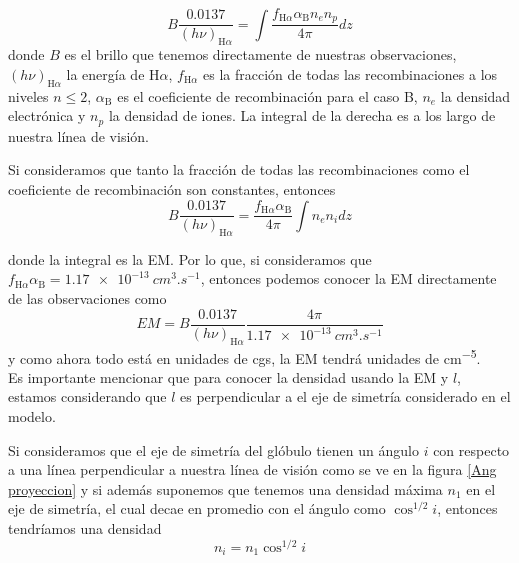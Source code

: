 \documentclass{book}
\begin{document}
\begin{equation}
    B\frac{0.0137}{(h\nu)_{\mathrm{H}\alpha}}=\int \frac{f_{\mathrm{H}\alpha}\alpha_\mathrm{B} n_e n_p}{4\pi} dz
\end{equation}
donde $B$ es el brillo que tenemos directamente de nuestras observaciones, $(h\nu)_{\mathrm{H}\alpha}$ la energía de H$\alpha$, $f_{\mathrm{H}\alpha}$ es la fracción de todas las recombinaciones a los niveles $n\le 2$, $\alpha_\mathrm{B}$ es el coeficiente de recombinación para el caso B, $n_e$ la densidad electrónica y $n_p$ la densidad de iones. La integral de la derecha es a los largo de nuestra línea de visión.

Si consideramos que tanto la fracción de todas las recombinaciones como el coeficiente de recombinación son constantes, entonces
\begin{equation}
    B\frac{0.0137}{(h\nu)_{\mathrm{H}\alpha}}=\frac{f_{\mathrm{H}\alpha}\alpha_\mathrm{B}}{4\pi}\int n_e n_i dz
\end{equation}

donde la integral es la EM. Por lo que, si consideramos que $f_{\mathrm{H}\alpha}\alpha_\mathrm{B}=\SI{1.17e-13}{cm^3.s^{-1}}$, entonces podemos conocer la EM directamente de las observaciones como
\begin{equation}
    EM = B\frac{0.0137}{(h\nu)_{\mathrm{H}\alpha}}\frac{4\pi}{\SI{1.17e-13}{cm^3.s^{-1}}}
\end{equation}
y como ahora todo está en unidades de cgs, la EM tendrá unidades de \unit{cm^{-5}}.\\


Es importante mencionar que  para conocer la densidad usando la EM y $l$, estamos considerando que $l$ es perpendicular a el eje de simetría considerado en el modelo. 

Si consideramos que el eje de simetría del glóbulo tienen un ángulo $i$ con respecto a una línea perpendicular a nuestra línea de visión como se ve en la figura \ref{Ang proyeccion} y si además  suponemos que tenemos una densidad máxima $n_1$ en el eje de simetría, el cual decae en promedio con el ángulo como $\cos^{1/2} i$, entonces tendríamos  una densidad \begin{equation}n_i = n_1\cos^{1/2} i \end{equation}
\end{document}
